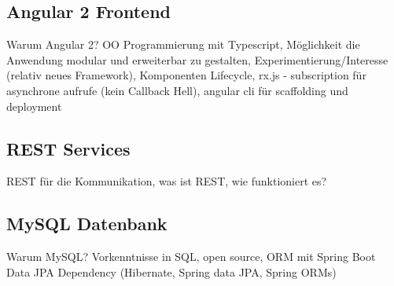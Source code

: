 \subsection{Angular 2 Frontend}


Warum Angular 2? OO Programmierung mit Typescript, Möglichkeit die Anwendung modular und erweiterbar zu gestalten, Experimentierung/Interesse (relativ neues Framework), Komponenten Lifecycle, rx.js - subscription für asynchrone aufrufe (kein Callback Hell), angular cli für scaffolding und deployment

\subsection{REST Services}
REST für die Kommunikation, was ist REST, wie funktioniert es?


\subsection{MySQL Datenbank}
Warum MySQL? Vorkenntnisse in SQL, open source, ORM mit Spring Boot Data JPA Dependency (Hibernate, Spring data JPA, Spring ORMs)